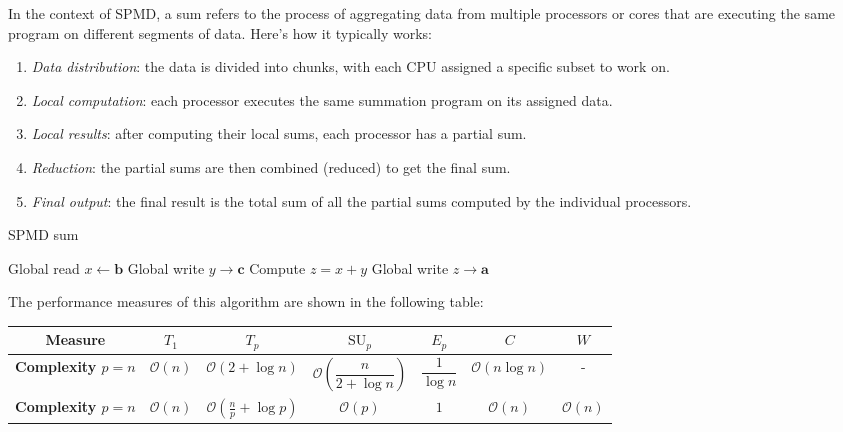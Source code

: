 In the context of SPMD, a sum refers to the process of aggregating data from multiple processors or cores that are executing the same program on different segments of data. 
Here's how it typically works:
\begin{enumerate}
    \item  \textit{Data distribution}: the data is divided into chunks, with each CPU assigned a specific subset to work on.
    \item \textit{Local computation}: each processor executes the same summation program on its assigned data.
    \item \textit{Local results}: after computing their local sums, each processor has a partial sum.
    \item \textit{Reduction}: the partial sums are then combined (reduced) to get the final sum. 
    \item \textit{Final output}: the final result is the total sum of all the partial sums computed by the individual processors.
\end{enumerate}

\begin{algorithm}[H]
    \caption{SPMD sum}
    \begin{algorithmic}[1]
        \State Global read $x \leftarrow \mathbf{b}$ 
        \State Global write $y \rightarrow \mathbf{c}$ 
        \State Compute $z=x+y$ 
        \State Global write $z\rightarrow \mathbf{a}$ 
    \end{algorithmic}
\end{algorithm}
The performance measures of this algorithm are shown in the following table:
\renewcommand*{\arraystretch}{2}
\begin{table}[H]
    \centering
    \begin{tabular}{|c|cccccc|}
    \hline
    \textbf{Measure} & $T_1$ & $T_p$ & $\text{SU}_p$ & $E_p$ & $C$ & $W$  \\ \hline
    \textbf{Complexity $p=n$} & $\mathcal{O}(n)$ & $\mathcal{O}\left(2+\log n\right)$ & $\mathcal{O}\left(\dfrac{n}{2+\log n}\right)$ & $\dfrac{1}{\log n}$ & $\mathcal{O}(n\log n)$ & - \\ \hline
    \textbf{Complexity $p=n$} & $\mathcal{O}(n)$ & $\mathcal{O}\left(\frac{n}{p}+\log p\right)$ & $\mathcal{O}(p)$ & $1$ & $\mathcal{O}(n)$ & $\mathcal{O}(n)$ \\ \hline
    \end{tabular}
\end{table}
\renewcommand*{\arraystretch}{1}

